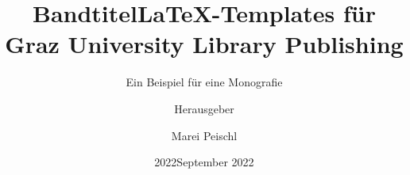 \documentclass[ngerman]{unigrazpub}%
\title{Bandtitel}
\author{Herausgeber}
\date{2022}
\begin{document}
	
\author{Marei Peischl}
\title{\LaTeX-Templates für Graz University Library Publishing}
\subtitle{Ein Beispiel für eine Monografie}
\date{September 2022}



\maketitle
	

\tableofcontents



\appendix

\printbibliography
\end{document}
